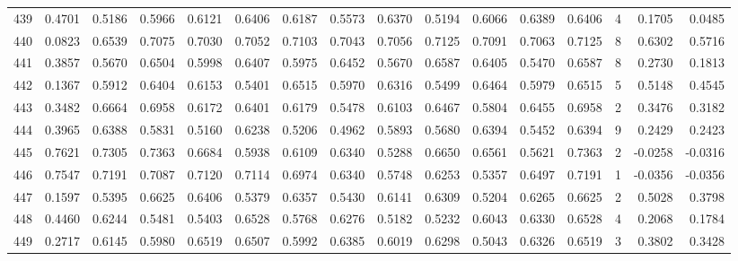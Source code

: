 \begin{tabular}{lrrrrrrrrrrrrrrr}
439 &      0.4701 &  0.5186 &  0.5966 &  0.6121 &  0.6406 &  0.6187 &  0.5573 &  0.6370 &  0.5194 &  0.6066 &   0.6389 &     0.6406 &      4 &                    0.1705 &                     0.0485 \\
440 &      0.0823 &  0.6539 &  0.7075 &  0.7030 &  0.7052 &  0.7103 &  0.7043 &  0.7056 &  0.7125 &  0.7091 &   0.7063 &     0.7125 &      8 &                    0.6302 &                     0.5716 \\
441 &      0.3857 &  0.5670 &  0.6504 &  0.5998 &  0.6407 &  0.5975 &  0.6452 &  0.5670 &  0.6587 &  0.6405 &   0.5470 &     0.6587 &      8 &                    0.2730 &                     0.1813 \\
442 &      0.1367 &  0.5912 &  0.6404 &  0.6153 &  0.5401 &  0.6515 &  0.5970 &  0.6316 &  0.5499 &  0.6464 &   0.5979 &     0.6515 &      5 &                    0.5148 &                     0.4545 \\
443 &      0.3482 &  0.6664 &  0.6958 &  0.6172 &  0.6401 &  0.6179 &  0.5478 &  0.6103 &  0.6467 &  0.5804 &   0.6455 &     0.6958 &      2 &                    0.3476 &                     0.3182 \\
444 &      0.3965 &  0.6388 &  0.5831 &  0.5160 &  0.6238 &  0.5206 &  0.4962 &  0.5893 &  0.5680 &  0.6394 &   0.5452 &     0.6394 &      9 &                    0.2429 &                     0.2423 \\
445 &      0.7621 &  0.7305 &  0.7363 &  0.6684 &  0.5938 &  0.6109 &  0.6340 &  0.5288 &  0.6650 &  0.6561 &   0.5621 &     0.7363 &      2 &                   -0.0258 &                    -0.0316 \\
446 &      0.7547 &  0.7191 &  0.7087 &  0.7120 &  0.7114 &  0.6974 &  0.6340 &  0.5748 &  0.6253 &  0.5357 &   0.6497 &     0.7191 &      1 &                   -0.0356 &                    -0.0356 \\
447 &      0.1597 &  0.5395 &  0.6625 &  0.6406 &  0.5379 &  0.6357 &  0.5430 &  0.6141 &  0.6309 &  0.5204 &   0.6265 &     0.6625 &      2 &                    0.5028 &                     0.3798 \\
448 &      0.4460 &  0.6244 &  0.5481 &  0.5403 &  0.6528 &  0.5768 &  0.6276 &  0.5182 &  0.5232 &  0.6043 &   0.6330 &     0.6528 &      4 &                    0.2068 &                     0.1784 \\
449 &      0.2717 &  0.6145 &  0.5980 &  0.6519 &  0.6507 &  0.5992 &  0.6385 &  0.6019 &  0.6298 &  0.5043 &   0.6326 &     0.6519 &      3 &                    0.3802 &                     0.3428 \\

\end{tabular}
